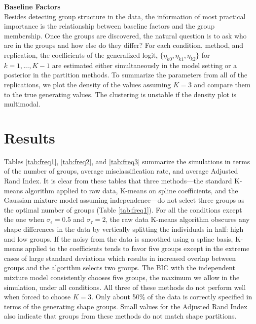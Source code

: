 \textbf{Baseline Factors}\\
Besides detecting group structure in the data, the information of most practical importance is the relationship between baseline factors and the group membership. Once the groups are discovered, the natural question is to ask who are in the groups and how else do they differ? For each condition, method, and replication, the coefficients of the generalized logit, $\{\eta_{k0},\eta_{k1},\eta_{k2}\}$ for $k=1,...,K-1$ are estimated either simultaneously in the model setting or a posterior in the partition methods. To summarize the parameters from all of the replications, we plot the density of the values assuming $K=3$ and compare them to the true generating values. The clustering is unstable if the density plot is multimodal.

\section{Results}
Tables \ref{tab:freq1}, \ref{tab:freq2}, and \ref{tab:freq3} summarize the simulations in terms of the number of groups, average misclassification rate, and average Adjusted Rand Index. It is clear from these tables that three methods---the standard K-means algorithm applied to raw data, K-means on spline coefficients, and the Gaussian mixture model assuming independence---do not select three groups as the optimal number of groups (Table \ref{tab:freq1}). For all the conditions except the one when $\sigma_{\epsilon}=0.5$ and $\sigma_{\tau}=2$, the raw data K-means algorithm obscures any shape differences in the data by vertically splitting the individuals in half: high and low groups. If the noisy from the data is smoothed using a spline basis, K-means applied to the coefficients tends to favor five groups except in the extreme cases of large standard deviations which results in increased overlap between groups and the algorithm selects two groups. The BIC with the independent mixture model consistently chooses five groups, the maximum we allow in the simulation, under all conditions. All three of these methods do not perform well when forced to choose $K=3$. Only about 50\% of the data is correctly specified in terms of the generating shape groups. Small values for the Adjusted Rand Index also indicate that groups from these methods do not match shape partitions.\\

